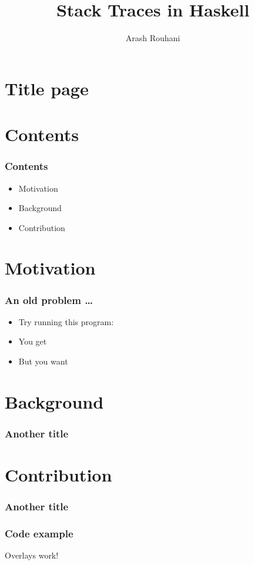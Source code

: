 \documentclass[11pt]{beamer} %
\title{Stack Traces in Haskell}
\author[Arash Rouhani]{Arash Rouhani} %
\institute{Chalmers University of Technology}
\begin{document}



\section{Title page} %
\begin{frame}[plain]
 \titlepage
\end{frame}

\section{Contents}
\begin{frame}
 \frametitle{Contents}
\begin{itemize}
 \item Motivation
 \item Background
 \item Contribution
\end{itemize}
\end{frame}

\section{Motivation}
\begin{frame}
 \frametitle{An old problem \dots}
\begin{itemize}
 \item Try running this program:
   \motivationCode
 \item You get
   \outputNoTrace
 \item But you want
   \outputTrace
\end{itemize}
\end{frame}

\section{Background}
\begin{frame}
 \frametitle{Another title}
\end{frame}

\section{Contribution}
\begin{frame}
 \frametitle{Another title}
\end{frame}

\begin{frame}
\frametitle{Code example}
\exampleCode
\pause
Overlays work!
\end{frame}
\end{document}
